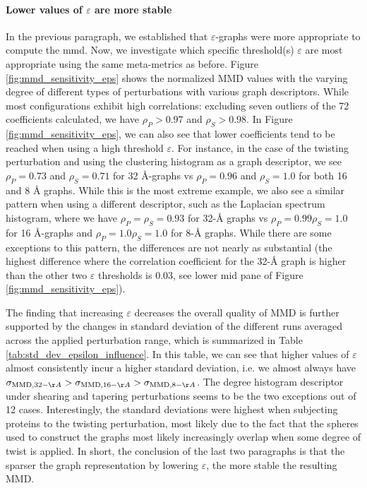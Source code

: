 \paragraph{Lower values of $\varepsilon$ are more stable} In the previous paragraph, we established that $\varepsilon$-graphs were more
appropriate to compute the \acrshort{mmd}. Now, we investigate which specific
threshold(s) $\varepsilon$ are most appropriate using the same meta-metrics as
before. Figure \ref{fig:mmd_sensitivity_eps} shows the normalized MMD values
with the varying degree of different types of perturbations with various graph
descriptors. While most configurations exhibit high correlations: excluding
seven outliers of the 72 coefficients calculated, we have $\rho_P>0.97$ and
$\rho_S>0.98$. In Figure \ref{fig:mmd_sensitivity_eps}, we can also see that
lower coefficients tend to be reached when using a high threshold $\varepsilon$.
For instance, in the case of the twisting perturbation and using the clustering
histogram as a graph descriptor, we see $\rho_P=0.73$ and $\rho_S=0.71$ for 32
\si{\angstrom}-graphs vs $\rho_P=0.96$ and $\rho_S=1.0$ for both 16 and 8
\si{\angstrom} graphs. While this is the most extreme example, we also see a
similar pattern when using a different descriptor, such as the Laplacian
spectrum histogram, where we have $\rho_P=\rho_S=0.93$ for 32-\si{\angstrom}
graphs vs $\rho_P=0.99 \rho_S=1.0$ for 16 \si{\angstrom}-graphs and $\rho_P=1.0
\rho_S=1.0$ for 8-\si{\angstrom} graphs. While there are some exceptions to this
pattern, the differences are not nearly as substantial (the highest difference
where the correlation coefficient for the 32-\si{\angstrom} graph is higher than
the other two $\varepsilon$ thresholds is 0.03, see lower mid pane of Figure
\ref{fig:mmd_sensitivity_eps}).

The finding that increasing $\varepsilon$ decreases the overall quality of MMD
is further supported by the changes in standard deviation of the different runs
averaged across the applied perturbation range, which is summarized in Table
\ref{tab:std_dev_epsilon_influence}. In this table, we can see that higher
values of $\varepsilon$ almost consistently incur a higher standard deviation,
i.e. we almost always have $\sigma_{\MMD, 32-\AA}>\sigma_{\MMD,
16-\AA}>\sigma_{\MMD, 8-\AA}$. The degree histogram descriptor under shearing
and tapering perturbations seems to be the two exceptions out of 12 cases.
Interestingly, the standard deviations were highest when subjecting proteins to
the twisting perturbation, most likely due to the fact that the spheres used to
construct the graphs most likely increasingly overlap when some degree of twist
is applied. In short, the conclusion of the last two paragraphs is that the
sparser the graph representation by lowering $\varepsilon$, the more stable the
resulting MMD.

